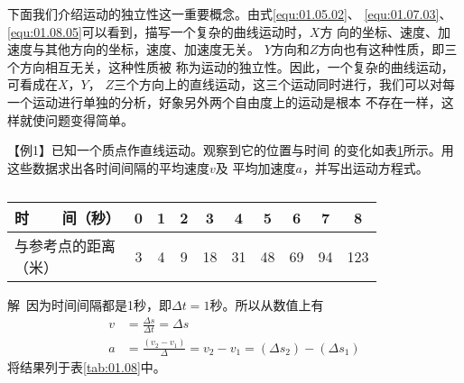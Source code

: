 下面我们介绍运动的独立性这一重要概念。由式\eqref{equ:01.05.02}、
\eqref{equ:01.07.03}、\eqref{equ:01.08.05}可以看到，描写一个复杂的曲线运动时，$X$方
向的坐标、速度、加速度与其他方向的坐标，速度、加速度无关。
$Y$方向和$Z$方向也有这种性质，即三个方向相互无关，这种性质被
称为运动的独立性。因此，一个复杂的曲线运动，可看成在$X$，$Y$，
$Z$三个方向上的直线运动，这三个运动同时进行，我们可以对每
一个运动进行单独的分析，好象另外两个自由度上的运动是根本
不存在一样，这样就使问题变得简单。

\heiti 【例1】\normalfont 已知一个质点作直线运动。观察到它的位置与时间
的变化如表\ref{tab:01.07}所示。用这些数据求出各时间间隔的平均速度$v$及
平均加速度$a$，并写出运动方程式。
\begin{table}[!h]
    \vspace{-0.5em}
    \caption{}
    \label{tab:01.07}
    \centering
        \begin{tabular}{l|c|c|c|c|c|c|c|c|c}
            \toprule
            时~~~~间（秒）        &  0  &  1  &  2  &   3  &   4  &   5  &   6  &   7 &   8 \\
            \midrule
            \makecell{与参考点的距离\\（米）}  &  3  &  4  &  9  &  18  &  31  &  48  &  69  &  94 & 123 \\
            \bottomrule
    \end{tabular}
    \vspace{-1.2em}
\end{table}

\heiti 解~\normalfont 因为时间间隔都是1秒，即$\Delta t=1$秒。所以从数值上有
\begin{align*}
    v&=\frac{\Delta s}{\Delta t}=\Delta s \\
    a&=\frac{(v_2-v_1)}{\Delta}=v_2-v_1=(\Delta s_2)-(\Delta s_1)
\end{align*}
将结果列于表\ref{tab:01.08}中。


